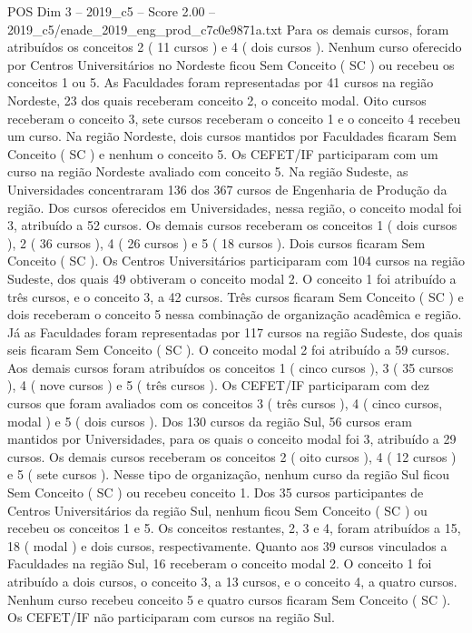 \begin{textsample}{POS Dim 3 – 2019\_c5 – Score 2.00 – 2019\_c5/enade\_2019\_eng\_prod\_c7c0e9871a.txt}
Para os demais cursos, foram atribuídos os conceitos 2 ( 11 cursos ) e 4 ( dois cursos ).
Nenhum curso oferecido por Centros Universitários no Nordeste ficou Sem Conceito ( SC ) ou recebeu os conceitos 1 ou 5.
As Faculdades foram representadas por 41 cursos na região Nordeste, 23 dos quais receberam conceito 2, o conceito modal.
Oito cursos receberam o conceito 3, sete cursos receberam o conceito 1 e o conceito 4 recebeu um curso.
Na região Nordeste, dois cursos mantidos por Faculdades ficaram Sem Conceito ( SC ) e nenhum o conceito 5.
Os CEFET/IF participaram com um curso na região Nordeste avaliado com conceito 5.
Na região Sudeste, as Universidades concentraram 136 dos 367 cursos de Engenharia de Produção da região.
Dos cursos oferecidos em Universidades, nessa região, o conceito modal foi 3, atribuído a 52 cursos.
Os demais cursos receberam os conceitos 1 ( dois cursos ), 2 ( 36 cursos ), 4 ( 26 cursos ) e 5 ( 18 cursos ).
Dois cursos ficaram Sem Conceito ( SC ).
Os Centros Universitários participaram com 104 cursos na região Sudeste, dos quais 49 obtiveram o conceito modal 2.
O conceito 1 foi atribuído a três cursos, e o conceito 3, a 42 cursos.
Três cursos ficaram Sem Conceito ( SC ) e dois receberam o conceito 5 nessa combinação de organização acadêmica e região.
Já as Faculdades foram representadas por 117 cursos na região Sudeste, dos quais seis ficaram Sem Conceito ( SC ).
O conceito modal 2 foi atribuído a 59 cursos.
Aos demais cursos foram atribuídos os conceitos 1 ( cinco cursos ), 3 ( 35 cursos ), 4 ( nove cursos ) e 5 ( três cursos ).
Os CEFET/IF participaram com dez cursos que foram avaliados com os conceitos 3 ( três cursos ), 4 ( cinco cursos, modal ) e 5 ( dois cursos ).
Dos 130 cursos da região Sul, 56 cursos eram mantidos por Universidades, para os quais o conceito modal foi 3, atribuído a 29 cursos.
Os demais cursos receberam os conceitos 2 ( oito cursos ), 4 ( 12 cursos ) e 5 ( sete cursos ).
Nesse tipo de organização, nenhum curso da região Sul ficou Sem Conceito ( SC ) ou recebeu conceito 1.
Dos 35 cursos participantes de Centros Universitários da região Sul, nenhum ficou Sem Conceito ( SC ) ou recebeu os conceitos 1 e 5.
Os conceitos restantes, 2, 3 e 4, foram atribuídos a 15, 18 ( modal ) e dois cursos, respectivamente.
Quanto aos 39 cursos vinculados a Faculdades na região Sul, 16 receberam o conceito modal 2.
O conceito 1 foi atribuído a dois cursos, o conceito 3, a 13 cursos, e o conceito 4, a quatro cursos.
Nenhum curso recebeu conceito 5 e quatro cursos ficaram Sem Conceito ( SC ).
Os CEFET/IF não participaram com cursos na região Sul.

\end{textsample}
